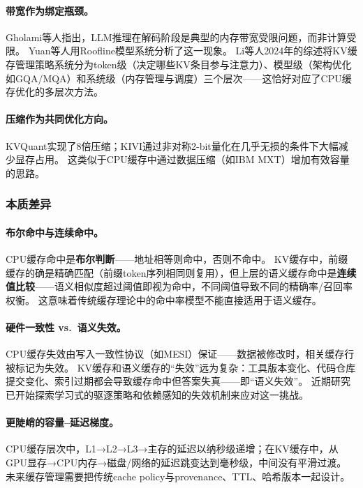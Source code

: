 \paragraph{带宽作为绑定瓶颈。}
Gholami等人指出，LLM推理在解码阶段是典型的内存带宽受限问题，而非计算受限\cite{gholami2024memorywall}。
Yuan等人用Roofline模型系统分析了这一现象\cite{yuan2024llminference}。
Li等人2024年的综述将KV缓存管理策略系统分为token级（决定哪些KV条目参与注意力）、模型级（架构优化如GQA/MQA）和系统级（内存管理与调度）三个层次\cite{likvcache2024survey}——这恰好对应了CPU缓存优化的多层次方法。

\paragraph{压缩作为共同优化方向。}
KVQuant实现了8倍压缩\cite{hooper2024kvquant}；KIVI通过非对称2-bit量化在几乎无损的条件下大幅减少显存占用\cite{liu2024kivi}。
这类似于CPU缓存中通过数据压缩（如IBM MXT）增加有效容量的思路。

\subsubsection{本质差异}

\paragraph{布尔命中与连续命中。}
CPU缓存命中是\textbf{布尔判断}——地址相等则命中，否则不命中。
KV缓存中，前缀缓存的确是精确匹配（前缀token序列相同则复用），但上层的语义缓存命中是\textbf{连续值比较}——语义相似度超过阈值即视为命中，不同阈值导致不同的精确率/召回率权衡。
这意味着传统缓存理论中的命中率模型不能直接适用于语义缓存。

\paragraph{硬件一致性 vs.\ 语义失效。}
CPU缓存失效由写入一致性协议（如MESI）保证——数据被修改时，相关缓存行被标记为失效。
KV缓存和语义缓存的``失效''远为复杂：工具版本变化、代码仓库提交变化、索引过期都会导致缓存命中但答案失真——即``语义失效''。
近期研究已开始探索学习式的驱逐策略\cite{lpc2025}和依赖感知的失效机制\cite{multilevelcache2025}来应对这一挑战。

\paragraph{更陡峭的容量--延迟梯度。}
CPU缓存层次中，L1→L2→L3→主存的延迟以纳秒级递增；在KV缓存中，从GPU显存→CPU内存→磁盘/网络的延迟跳变达到毫秒级，中间没有平滑过渡。
未来缓存管理需要把传统cache policy与provenance、TTL、哈希版本一起设计。

